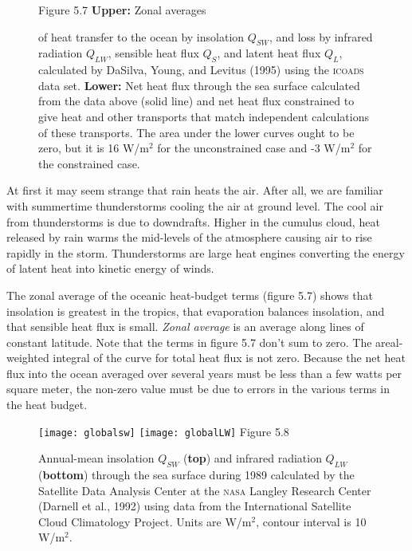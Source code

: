 \begin{figure}[b!]
\vspace{-2ex}
\footnotesize
Figure 5.7 \textbf{Upper:} Zonal averages \rule{0mm}{4ex}of heat
transfer to the ocean by insolation $Q_{SW}$, and loss by
infrared radiation
$Q_{LW}$, sensible heat flux $Q_S$, and latent heat flux $Q_L$, calculated by
DaSilva, Young, and Levitus (1995) using the \textsc{icoads} data set.
\textbf{Lower:} Net heat flux through the sea surface calculated from the data
above (solid line) and net heat flux constrained to give heat
and other transports that match independent calculations of these transports. The area under the lower curves ought to be zero, but it is 16 W/m$^2$ for the unconstrained case and -3 W/m$^2$ for the constrained case.
\label{fig:zonalaveheat}
\end{figure}

At first it may seem strange that rain heats the air. After
all, we are familiar with summertime thunderstorms cooling the air at ground
level. The cool air from thunderstorms is due to downdrafts. Higher in the
cumulus cloud, heat released by rain warms the mid-levels of the atmosphere
causing air to rise rapidly in the storm. Thunderstorms are large heat engines
converting the energy of latent heat into kinetic energy of winds.

The zonal average of the oceanic heat-budget terms (figure 5.7) shows that
insolation is greatest in the tropics, that evaporation
balances insolation, and that sensible heat flux is
small.
\textit{Zonal average} is an average along lines of
constant latitude. Note that the terms in figure 5.7 don't sum to zero. The areal-weighted
integral of the curve for total heat flux is not zero. Because
the net heat flux into the ocean averaged over several years
must be less than a few watts per square meter, the non-zero value must be due to errors in the
various terms in the heat budget.

\begin{figure}[t!]
\texttt{[image: globalsw]}
\texttt{[image: globalLW]}
\footnotesize
Figure 5.8 \rule{0mm}{3ex}Annual-mean
insolation $Q_{SW}$ (\textbf{top}) and infrared radiation
$Q_{LW}$ (\textbf{bottom}) through the sea surface during 1989 calculated by the
Satellite Data Analysis Center at the \textsc{nasa} Langley Research Center
(Darnell et al., 1992) using data from the International Satellite Cloud
Climatology Project. Units are W/m$^2$, contour interval is 10 W/m$^2$.
\label{fig:globalSW}
\vspace{-4ex}
\end{figure}

